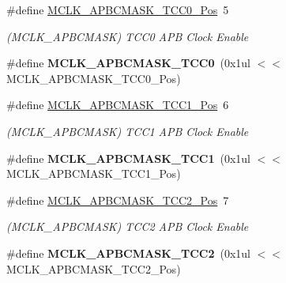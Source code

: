 \begin{DoxyCompactItemize}
\item 
\hypertarget{group___s_a_m_l21___m_c_l_k_gaa3256a05915a7aa02553f9661d4e15fa}{}\#define \hyperlink{group___s_a_m_l21___m_c_l_k_gaa3256a05915a7aa02553f9661d4e15fa}{M\+C\+L\+K\+\_\+\+A\+P\+B\+C\+M\+A\+S\+K\+\_\+\+T\+C\+C0\+\_\+\+Pos}~5\label{group___s_a_m_l21___m_c_l_k_gaa3256a05915a7aa02553f9661d4e15fa}

\begin{DoxyCompactList}\small\item\em (M\+C\+L\+K\+\_\+\+A\+P\+B\+C\+M\+A\+S\+K) T\+C\+C0 A\+P\+B Clock Enable \end{DoxyCompactList}\item 
\hypertarget{group___s_a_m_l21___m_c_l_k_gab312835922e01e936961833fbd6692c7}{}\#define {\bfseries M\+C\+L\+K\+\_\+\+A\+P\+B\+C\+M\+A\+S\+K\+\_\+\+T\+C\+C0}~(0x1ul $<$$<$ M\+C\+L\+K\+\_\+\+A\+P\+B\+C\+M\+A\+S\+K\+\_\+\+T\+C\+C0\+\_\+\+Pos)\label{group___s_a_m_l21___m_c_l_k_gab312835922e01e936961833fbd6692c7}

\item 
\hypertarget{group___s_a_m_l21___m_c_l_k_gac5b9251c80361f67ac79d6e263f17cd7}{}\#define \hyperlink{group___s_a_m_l21___m_c_l_k_gac5b9251c80361f67ac79d6e263f17cd7}{M\+C\+L\+K\+\_\+\+A\+P\+B\+C\+M\+A\+S\+K\+\_\+\+T\+C\+C1\+\_\+\+Pos}~6\label{group___s_a_m_l21___m_c_l_k_gac5b9251c80361f67ac79d6e263f17cd7}

\begin{DoxyCompactList}\small\item\em (M\+C\+L\+K\+\_\+\+A\+P\+B\+C\+M\+A\+S\+K) T\+C\+C1 A\+P\+B Clock Enable \end{DoxyCompactList}\item 
\hypertarget{group___s_a_m_l21___m_c_l_k_ga3c4f3ae83b54444e0a1cc32ff8beb6bd}{}\#define {\bfseries M\+C\+L\+K\+\_\+\+A\+P\+B\+C\+M\+A\+S\+K\+\_\+\+T\+C\+C1}~(0x1ul $<$$<$ M\+C\+L\+K\+\_\+\+A\+P\+B\+C\+M\+A\+S\+K\+\_\+\+T\+C\+C1\+\_\+\+Pos)\label{group___s_a_m_l21___m_c_l_k_ga3c4f3ae83b54444e0a1cc32ff8beb6bd}

\item 
\hypertarget{group___s_a_m_l21___m_c_l_k_ga4f871f80238ad9bbb73e2f8656a9e59d}{}\#define \hyperlink{group___s_a_m_l21___m_c_l_k_ga4f871f80238ad9bbb73e2f8656a9e59d}{M\+C\+L\+K\+\_\+\+A\+P\+B\+C\+M\+A\+S\+K\+\_\+\+T\+C\+C2\+\_\+\+Pos}~7\label{group___s_a_m_l21___m_c_l_k_ga4f871f80238ad9bbb73e2f8656a9e59d}

\begin{DoxyCompactList}\small\item\em (M\+C\+L\+K\+\_\+\+A\+P\+B\+C\+M\+A\+S\+K) T\+C\+C2 A\+P\+B Clock Enable \end{DoxyCompactList}\item 
\hypertarget{group___s_a_m_l21___m_c_l_k_ga19eb46ff025f9b876d0bb25038a441c9}{}\#define {\bfseries M\+C\+L\+K\+\_\+\+A\+P\+B\+C\+M\+A\+S\+K\+\_\+\+T\+C\+C2}~(0x1ul $<$$<$ M\+C\+L\+K\+\_\+\+A\+P\+B\+C\+M\+A\+S\+K\+\_\+\+T\+C\+C2\+\_\+\+Pos)\label{group___s_a_m_l21___m_c_l_k_ga19eb46ff025f9b876d0bb25038a441c9}


\end{DoxyCompactItemize}
